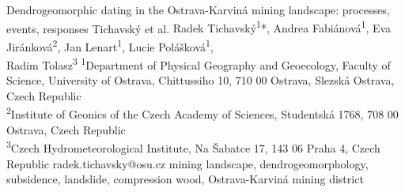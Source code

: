 \abstract
{Dendrogeomorphic dating in the Ostrava-Karviná mining landscape: processes, events, responses} %
{Tichavský et al.} %
{Radek Tichavský\textsuperscript{1}*, Andrea Fabiánová\textsuperscript{1}, Eva Jiránková\textsuperscript{2}, Jan Lenart\textsuperscript{1}, Lucie Polášková\textsuperscript{1}, \\Radim Tolasz\textsuperscript{3}
} %
{\TLtag} %
{
\textsuperscript{1}Department of Physical Geography and Geoecology, Faculty of Science, University of Ostrava, Chittussiho 10, 710 00 Ostrava, Slezská Ostrava, Czech Republic\\
\textsuperscript{2}Institute of Geonics of the Czech Academy of Sciences, Studentská 1768, 708 00 Ostrava, Czech Republic\\
\textsuperscript{3}Czech Hydrometeorological Institute, Na Šabatce 17, 143 06 Praha 4, Czech Republic
} %
{radek.tichavsky@osu.cz}  %
{mining landscape, dendrogeomorphology, subsidence, landslide, compression wood, Ostrava-Karviná mining district}%
